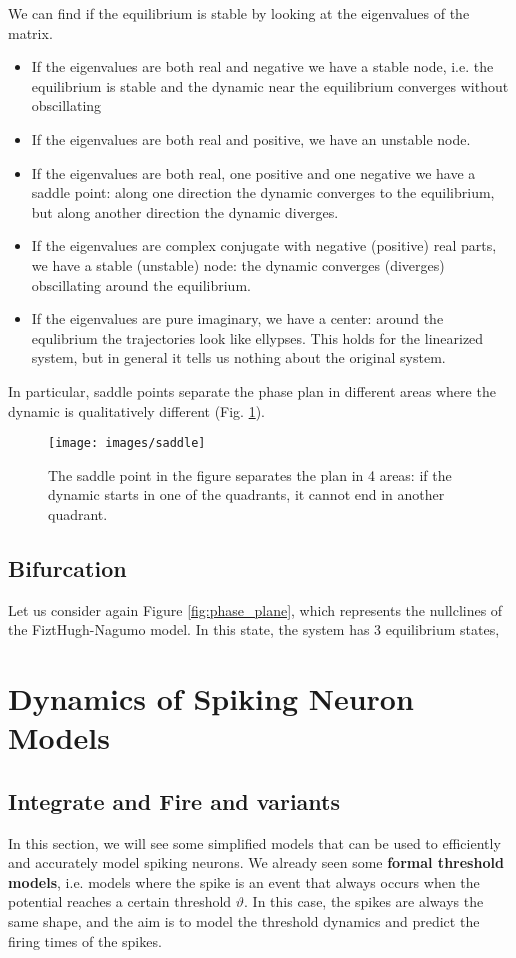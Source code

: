 \documentclass[oneside]{book}
\theoremstyle{definition}
\theoremstyle{plain}
\begin{document}
We can find if the equilibrium is stable by looking at the eigenvalues of the matrix.
\begin{itemize}
    \item If the eigenvalues are both real and negative we have a stable node, i.e. the equilibrium is stable and the dynamic near the equilibrium converges without obscillating
    \item   If the eigenvalues are both real and positive, we have an unstable node. 
    \item If the eigenvalues are both real, one positive and one negative we have a saddle point: along one direction the dynamic converges to the equilibrium, but along another direction the dynamic diverges.
    \item If the eigenvalues are complex conjugate with negative (positive) real parts, we have a stable (unstable) node: the dynamic converges (diverges) obscillating around the equilibrium.
    \item If the eigenvalues are pure imaginary, we have a center: around the equlibrium the trajectories look like ellypses. This holds for the linearized system, but in general it tells us nothing about the original system.  
\end{itemize}

In particular, saddle points separate the phase plan in different areas where the dynamic is qualitatively different (Fig. \ref{fig:saddle-point}).
\begin{figure}
    \centering
    \texttt{[image: images/saddle]}
    \caption{The saddle point in the figure separates the plan in 4 areas: if the dynamic starts in one of the quadrants, it cannot end in another quadrant.}
    \label{fig:saddle-point}
\end{figure}

\subsection{Bifurcation}
Let us consider again Figure \ref{fig:phase_plane}, which represents the nullclines of the FiztHugh-Nagumo model. In this state, the system has 3 equilibrium states, 

\section{Dynamics of Spiking Neuron Models}
\subsection{Integrate and Fire and variants}
In this section, we will see some simplified models that can be used to efficiently and accurately model spiking neurons. We already seen some \textbf{formal threshold models}, i.e. models where the spike is an event that always occurs when the potential reaches a certain threshold $\vartheta$. In this case, the spikes are always the same shape, and the aim is to model the threshold dynamics and predict the firing times of the spikes.
\end{document}
